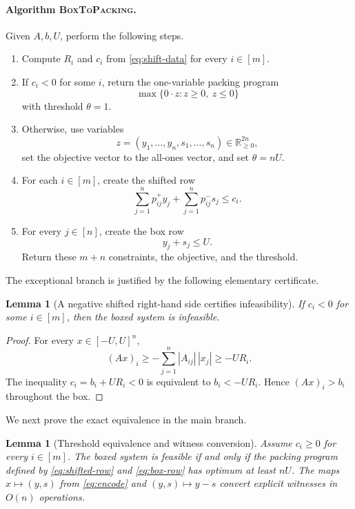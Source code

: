 \documentclass[11pt]{article}
\newtheorem{lemma}[theorem]{Lemma}
\theoremstyle{remark}
\newcommand{\R}{\mathbb{R}}
\begin{document}
\paragraph{Algorithm \textsc{BoxToPacking}.}
Given $A,b,U$, perform the following steps.
\begin{enumerate}[label=\arabic*.,leftmargin=2em]
  \item Compute $R_i$ and $c_i$ from \eqref{eq:shift-data} for every
  $i\in[m]$.

  \item If $c_i<0$ for some $i$, return the one-variable packing
  program
  \[
    \max\{0\cdot z:z\geq0,\ z\leq0\}
  \]
  with threshold $\theta=1$.

  \item Otherwise, use variables
  \[
    z=(y_1,\ldots,y_n,s_1,\ldots,s_n)\in\R_{\geq0}^{2n},
  \]
  set the objective vector to the all-ones vector, and set
  $\theta=nU$.

  \item For each $i\in[m]$, create the shifted row
  \begin{equation}
    \label{eq:shifted-row}
    \sum_{j=1}^n p^+_{ij}y_j+
    \sum_{j=1}^n p^-_{ij}s_j\leq c_i.
  \end{equation}

  \item For every $j\in[n]$, create the box row
  \begin{equation}
    \label{eq:box-row}
    y_j+s_j\leq U.
  \end{equation}
  Return these $m+n$ constraints, the objective, and the threshold.
\end{enumerate}

The exceptional branch is justified by the following elementary
certificate.

\begin{lemma}[A negative shifted right-hand side certifies infeasibility]
\label{lem:negative-shift}
If $c_i<0$ for some $i\in[m]$, then the boxed system is infeasible.
\end{lemma}

\begin{proof}
For every $x\in[-U,U]^n$,
\[
  (Ax)_i
  \geq-\sum_{j=1}^n|A_{ij}|\,|x_j|
  \geq-UR_i.
\]
The inequality $c_i=b_i+UR_i<0$ is equivalent to
$b_i<-UR_i$.  Hence $(Ax)_i>b_i$ throughout the box.
\end{proof}

We next prove the exact equivalence in the main branch.

\begin{lemma}[Threshold equivalence and witness conversion]
\label{lem:threshold-equivalence}
Assume $c_i\geq0$ for every $i\in[m]$.  The boxed system is feasible
if and only if the packing program defined by
\eqref{eq:shifted-row} and \eqref{eq:box-row} has optimum at least
$nU$.  The maps $x\mapsto(y,s)$ from \eqref{eq:encode} and
$(y,s)\mapsto y-s$ convert explicit witnesses in $O(n)$ operations.
\end{lemma}
\end{document}
